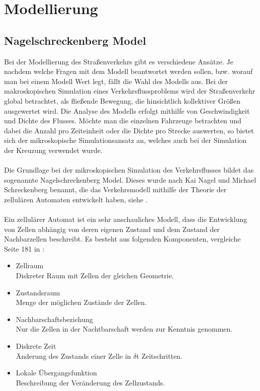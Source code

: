 \chapter{Modellierung}

\section{Nagelschreckenberg Model}
Bei der Modellierung des Straßenverkehrs gibt es verschiedene Ansätze. Je nachdem welche Fragen mit dem Modell beantwortet werden sollen, bzw. worauf man bei einem Modell Wert legt, fällt die Wahl des Modells aus. Bei der makroskopischen Simulation eines Verkehrsflussproblems wird der Straßenverkehr global betrachtet, als fließende Bewegung, die hinsichtlich kollektiver Größen ausgewertet wird. Die Analyse des Modells erfolgt mithilfe von Geschwindigkeit und Dichte des Flusses. Möchte man die einzelnen Fahrzeuge betrachten und dabei die Anzahl pro Zeiteinheit oder die Dichte pro Strecke auswerten, so bietet sich der mikroskopische Simulationsansatz an, welches auch bei der Simulation der Kreuzung verwendet wurde. \\
\\
Die Grundlage bei der mikroskopischen Simulation des Verkehrsflusses bildet das sogenannte Nagelschreckenberg Model. Dieses wurde nach Kai Nagel und Michael Schreckenberg benannt, die das Verkehrsmodell mithilfe der Theorie der zellulären Automaten entwickelt haben, siehe \cite{article:NaSch}. \\
\\
Ein zellulärer Automat ist ein sehr anschauliches Modell, dass die Entwicklung von Zellen abhängig von deren eigenen Zustand und dem Zustand der Nachbarzellen beschreibt. Es besteht aus folgenden Komponenten, vergleiche Seite 181 in \cite{book:bungartz}: 
\begin{itemize}
 	  \item Zellraum\\
      		Diskreter Raum mit Zellen der gleichen Geometrie.
      \item Zustandsraum\\
      		Menge der möglichen Zustände der Zellen.
      \item Nachbarschaftsbeziehung\\
      		Nur die Zellen in der Nachtbarschaft werden zur Kenntnis 				genommen.
      \item Diskrete Zeit \\
      		Änderung des Zustands einer Zelle in \( \delta \)t						Zeitschritten.
      \item Lokale Übergangsfunktion\\
      		Beschreibung der Veränderung des Zellzustands.
\end{itemize}

